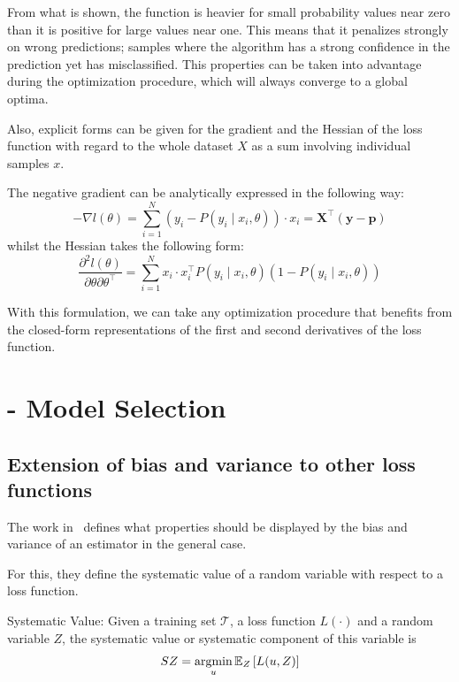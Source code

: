 \begin{appendices}
From what is shown, the function is heavier for small probability values near zero than it is positive for large values near one.
This means that it penalizes strongly on wrong predictions; samples where the algorithm has a strong confidence in the prediction yet has misclassified.
This properties can be taken into advantage during the optimization procedure, which will always converge to a global optima.

Also, explicit forms can be given for the gradient and the Hessian of the loss function with regard to the whole dataset $X$ as a sum involving individual samples $x$.

The negative gradient can be analytically expressed in the following way: %
\begin{equation}
- \nabla l(\theta) = \sum_{i=1}^N (y_i - P(y_i \mid x_i,\theta))\cdot x_i = \textbf{X}^{\intercal}(\textbf{y}-\textbf{p})
\label{eq:logitHessian1}
\end{equation}
whilst the Hessian takes the following form:
\begin{equation}
\frac{\partial^2 l(\theta)}{\partial \theta \partial \theta^\intercal} = \sum_{i=1}^N x_i \cdot x_i^\intercal P(y_i \mid x_i,\theta)(1 -P(y_i \mid x_i,\theta))
\label{eq:logitHessian2}
\end{equation}

With this formulation, we can take any optimization procedure that benefits from the closed-form representations of the first and second derivatives of the loss function.



\chapter{- Model Selection}

\section{Extension of bias and variance to other loss functions}\label{appx:sec:biasVarianceExtensionLoss}

The work in~\cite{james-biasVarianceGeneral} defines what properties should be displayed by the bias and variance of an estimator in the general case.

For this, they define the systematic value of a random variable with respect to a loss function.


\begin{definition}{Systematic Value:}
Given a training set $\mathcal{T}$, a loss function $L(\cdot)$ and a random variable $Z$, the systematic value or systematic component of this variable is
$$ SZ =  \operatorname*{argmin}_u \operatorname{\mathbb{E}}_{Z} \left[ L(u,Z) \right]$$
\end{definition}


\end{appendices}
